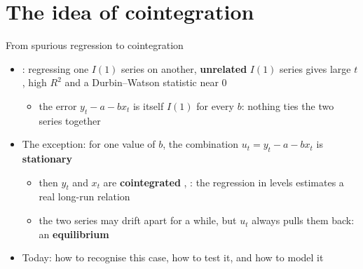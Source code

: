 \section{The idea of cointegration}

\begin{frame}{From spurious regression to cointegration}
\itemsize{\small}
\begin{itemize}
    \item {}: regressing one $I(1)$ series on another, \textbf{unrelated} $I(1)$ series gives large $t$, high $R^2$ and a Durbin--Watson statistic near 0 
    \begin{itemize}
        \item the error $y_t - a - b x_t$ is itself $I(1)$ for every $b$: nothing ties the two series together
    \end{itemize}
    \item The exception: for one value of $b$, the combination $u_t = y_t - a - b x_t$ is \textbf{stationary}
    \begin{itemize}
        \item then $y_t$ and $x_t$ are \textbf{cointegrated} , : the regression in levels estimates a real long-run relation
        \item the two series may drift apart for a while, but $u_t$ always pulls them back: an \textbf{equilibrium}
    \end{itemize}
    \item Today: how to recognise this case, how to test it, and how to model it
\end{itemize}
\end{frame}

